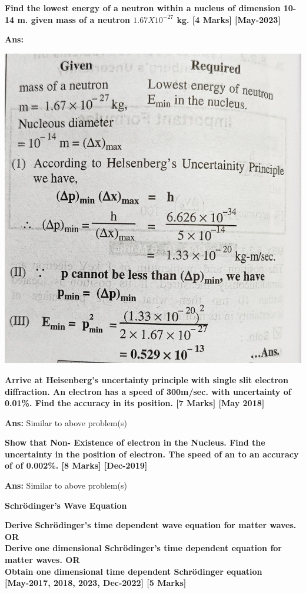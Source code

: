 \documentclass{exam}
\begin{document}
\begin{questions}
\question \textbf{ Find the lowest energy of a neutron within a nucleus of dimension 10-14 m. given mass of a neutron $1.67 X 10^{-27}$ kg. \hfil [4 Marks] [May-2023] }

\textbf{Ans:}
\begin{center}
\includegraphics[scale=0.2]{Q11.jpeg}
\end{center}

	
\question \textbf{ Arrive at Heisenberg's uncertainty principle with single slit electron diffraction. An electron has a speed of 300m/sec. with uncertainty of 0.01\%. Find the accuracy in its position. \hfil [7 Marks] [May 2018] }

\textbf{Ans:} Similar to above problem(s)

\question \textbf{ Show that Non- Existence of electron in the Nucleus. Find the uncertainty in the position of electron. The speed of an to an accuracy of of 0.002\%. \hfil [8 Marks] [Dec-2019] }

\textbf{Ans:} Similar to above problem(s)
\newpage

\begin{center} \textbf{ \Large Schrödinger's Wave Equation} \end{center}


\question \textbf{ Derive Schrödinger's time dependent wave equation for matter waves. OR \\
Derive one dimensional Schrödinger's time dependent equation for matter waves. OR \\ Obtain one dimensional time dependent Schrödinger equation \\ \hfil [May-2017, 2018, 2023,  Dec-2022] [5 Marks]}


\end{questions}
\end{document}
